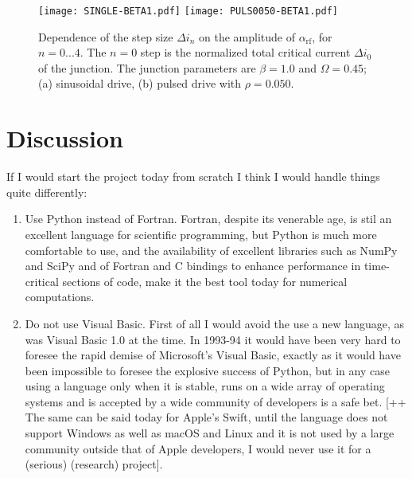 \begin{figure}[tbh]
	\centering
	\texttt{[image: SINGLE-BETA1.pdf]}
	\texttt{[image: PULS0050-BETA1.pdf]}
	\caption{Dependence of the step size $\Delta i_n$ on the amplitude of  $\alpha_\mathrm{rf}$, for $n = 0. . . 4$. The $n = 0$ step is the normalized total critical current $\Delta i_0$ of the junction. The junction parameters are $\beta = 1.0$ and $\Omega = 0. 45$; (a) sinusoidal drive, (b) pulsed drive with $\rho = 0. 050$.}
	\label{fig:step-width-beta1}
\end{figure}





\section{Discussion}

If I would start the project today from scratch I think I would handle things quite differently:

\begin{enumerate}

\item Use Python instead of Fortran. Fortran, despite its venerable age, is stil an excellent language for scientific programming, but Python is much more comfortable to use, and the availability of excellent libraries such as NumPy and SciPy and of Fortran and C bindings to enhance performance in time-critical sections of code, make it the best tool today for numerical computations.

\item Do not use Visual Basic. First of all I would avoid the use a new language, as was Visual Basic 1.0 at the time. In 1993-94 it would have been very hard to foresee the rapid demise of Microsoft's Visual Basic, exactly as it would have been impossible to foresee the explosive success of Python, but in any case using a language only when it is stable, runs on a wide array of operating systems and is accepted by a wide community of developers is a safe bet.
[++ The same can be said today for Apple's Swift, until the language does not support Windows as well as macOS and Linux and it is not used by a large community outside that of Apple developers, I would never use it for a (serious) (research) project].

\end{enumerate}
 

